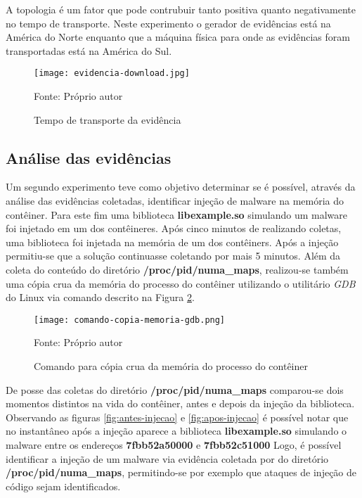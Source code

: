 %
A topologia é um fator que pode contrubuir tanto positiva quanto negativamente no tempo de transporte. 
%
Neste experimento o gerador de evidências está na América do Norte enquanto que a máquina física para onde as evidências foram transportadas está na América do Sul.

\begin{figure}[htb!]
\footnotesize
\caption{Tempo de transporte da evidência}
\texttt{[image: evidencia-download.jpg]}
\centering
\label{fig:evidencia-transporte}
\begin{center}
Fonte: Próprio autor 
\end{center}
\end{figure}


\subsection{Análise das evidências}
\label{sec:proposta-exp-analise}

Um segundo experimento teve como objetivo determinar se é possível, através da análise das evidências coletadas, identificar injeção de malware na memória do contêiner.
%
Para este fim uma biblioteca \textbf{libexample.so} simulando um malware foi injetado em um dos contêineres.
%
Após cinco minutos de \fancyname realizando coletas, uma biblioteca foi injetada na memória de um dos contêiners. Após a injeção permitiu-se que a solução continuasse coletando por mais 5 minutos.
%
Além da coleta do conteúdo do diretório \textbf{/proc/pid/numa\_maps}, realizou-se também uma cópia crua da memória do processo do contêiner utilizando o utilitário \textit{GDB} do Linux via comando descrito na Figura \ref{fig:comando-copia}.

\begin{figure}[htb!]
\footnotesize
\caption{Comando para cópia crua da memória do processo do contêiner}
\texttt{[image: comando-copia-memoria-gdb.png]}
\centering
\label{fig:comando-copia}
\begin{center}
Fonte: Próprio autor 
\end{center}
\end{figure}

%
De posse das coletas do diretório \textbf{/proc/pid/numa\_maps} comparou-se dois momentos distintos na vida do contêiner, antes e depois da injeção da biblioteca.
%
Observando as figuras \ref{fig:antes-injecao} e \ref{fig:apos-injecao} é possível notar que no instantâneo após a injeção aparece a biblioteca \textbf{libexample.so} simulando o malware entre os endereços \textbf{7fbb52a50000} e \textbf{7fbb52c51000}
%
Logo, é possível identificar a injeção de um malware via evidência coletada por \fancyname do diretório \textbf{/proc/pid/numa\_maps}, permitindo-se por exemplo que ataques de injeção de código sejam identificados. 

